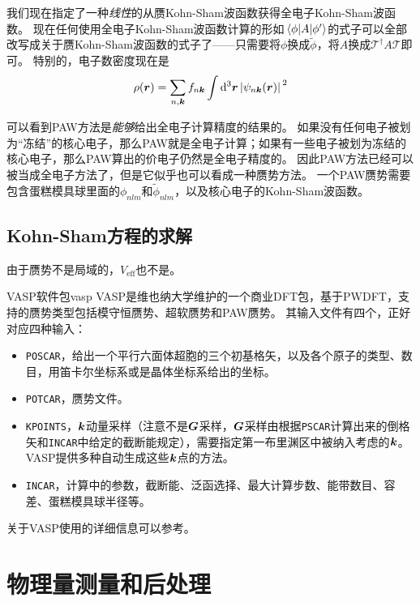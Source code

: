我们现在指定了一种\emph{线性}的从赝Kohn-Sham波函数获得全电子Kohn-Sham波函数。
现在任何使用全电子Kohn-Sham波函数计算的形如$\mel{\phi}{A}{\phi'}$的式子可以全部改写成关于赝Kohn-Sham波函数的式子了——只需要将$\phi$换成$\tilde{\phi}$，将$A$换成$\mathcal{T}^\dagger A \mathcal{T}$即可。
特别的，电子数密度现在是
\begin{equation}
    \rho(\vb*{r}) = \sum_{n, \vb*{k}} f_{n \vb*{k}} \int \dd[3]{\vb*{r}} \abs*{\psi_{n \vb*{k}}(\vb*{r})}^2  %
\end{equation}

可以看到PAW方法是\emph{能够}给出全电子计算精度的结果的。
如果没有任何电子被划为“冻结”的核心电子，那么PAW就是全电子计算；如果有一些电子被划为冻结的核心电子，那么PAW算出的价电子仍然是全电子精度的。
因此PAW方法已经可以被当成全电子方法了，但是它似乎也可以看成一种赝势方法。
一个PAW赝势需要包含蛋糕模具球里面的$\phi_{nlm}$和$\tilde{\phi}_{nlm}$，以及核心电子的Kohn-Sham波函数。

\subsection{Kohn-Sham方程的求解}

由于赝势不是局域的，$V_\text{eff}$也不是。

\begin{info}{VASP软件包}{vasp}
    VASP是维也纳大学维护的一个商业DFT包，基于PWDFT，支持的赝势类型包括模守恒赝势、超软赝势和PAW赝势。
    其输入文件有四个，正好对应四种输入：
    \begin{itemize}
        \item \texttt{POSCAR}，给出一个平行六面体超胞的三个初基格矢，以及各个原子的类型、数目，用笛卡尔坐标系或是晶体坐标系给出的坐标。
        \item \texttt{POTCAR}，赝势文件。
        \item \texttt{KPOINTS}，$\vb*{k}$动量采样（注意不是$\vb*{G}$采样，$\vb*{G}$采样由根据\texttt{PSCAR}计算出来的倒格矢和\texttt{INCAR}中给定的截断能规定），需要指定第一布里渊区中被纳入考虑的$\vb*{k}$。VASP提供多种自动生成这些$\vb*{k}$点的方法。
        \item \texttt{INCAR}，计算中的参数，截断能、泛函选择、最大计算步数、能带数目、容差、蛋糕模具球半径等。
    \end{itemize}

    关于VASP使用的详细信息可以参考\vaspdoc。
\end{info}

\section{物理量测量和后处理}

